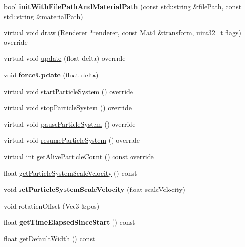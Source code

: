 \begin{DoxyCompactItemize}
bool {\bfseries init\+With\+File\+Path\+And\+Material\+Path} (const std\+::string \&file\+Path, const std\+::string \&material\+Path)
\item 
virtual void \hyperlink{classPUParticleSystem3D_a46c2d79b09fcac96e81be307f9148fea}{draw} (\hyperlink{classRenderer}{Renderer} $\ast$renderer, const \hyperlink{classMat4}{Mat4} \&transform, uint32\+\_\+t flags) override
\item 
virtual void \hyperlink{classPUParticleSystem3D_a42ba23b8909057126e8a9606f9cd4e8c}{update} (float delta) override
\item 
\mbox{\label{classPUParticleSystem3D_a9fdebd0f30d7dc8cc7873853b0fa2480}} 
void {\bfseries force\+Update} (float delta)
\item 
virtual void \hyperlink{classPUParticleSystem3D_ab59c7cf4ca02cb3cac7f9d49d46312f1}{start\+Particle\+System} () override
\item 
virtual void \hyperlink{classPUParticleSystem3D_a95eff5c73f4e750e34b0f1901bfdae3d}{stop\+Particle\+System} () override
\item 
virtual void \hyperlink{classPUParticleSystem3D_a646df19f678e37df2d1793d7f9a970a2}{pause\+Particle\+System} () override
\item 
virtual void \hyperlink{classPUParticleSystem3D_a02c88addf5387a7062e6418d6e8584c4}{resume\+Particle\+System} () override
\item 
virtual int \hyperlink{classPUParticleSystem3D_ae9437aa775ab70f4dde8acedc1ee124d}{get\+Alive\+Particle\+Count} () const override
\item 
float \hyperlink{classPUParticleSystem3D_ada896efd6a52b7ac28e28b14e7ac6515}{get\+Particle\+System\+Scale\+Velocity} () const
\item 
\mbox{\label{classPUParticleSystem3D_a2d82e348829365b8f991795fcea6e6be}} 
void {\bfseries set\+Particle\+System\+Scale\+Velocity} (float scale\+Velocity)
\item 
void \hyperlink{classPUParticleSystem3D_ac2ff2f8940f77cc569718feabab93995}{rotation\+Offset} (\hyperlink{classVec3}{Vec3} \&pos)
\item 
\mbox{\label{classPUParticleSystem3D_a40b7efbb668c110e618b67211e878ed2}} 
float {\bfseries get\+Time\+Elapsed\+Since\+Start} () const
\item 
float \hyperlink{classPUParticleSystem3D_acf39c57ba2ee73c1dfe332f5dbc5e8ae}{get\+Default\+Width} () const

\end{DoxyCompactItemize}
